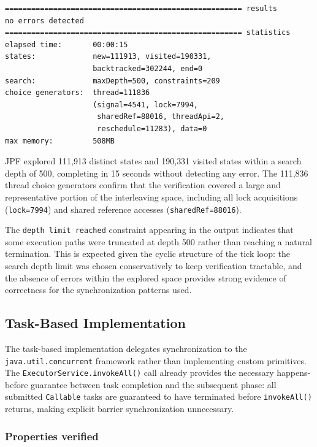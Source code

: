\documentclass[12pt,a4paper]{article}
\begin{document}
\begin{verbatim}
====================================================== results
no errors detected
====================================================== statistics
elapsed time:       00:00:15
states:             new=111913, visited=190331,
                    backtracked=302244, end=0
search:             maxDepth=500, constraints=209
choice generators:  thread=111836
                    (signal=4541, lock=7994,
                     sharedRef=88016, threadApi=2,
                     reschedule=11283), data=0
max memory:         508MB
\end{verbatim}

JPF explored 111{,}913 distinct states and 190{,}331 visited states
within a search depth of 500, completing in 15 seconds without detecting
any error. The 111{,}836 thread choice generators confirm that the
verification covered a large and representative portion of the
interleaving space, including all lock acquisitions (\texttt{lock=7994})
and shared reference accesses (\texttt{sharedRef=88016}).

The \texttt{depth limit reached} constraint appearing in the output
indicates that some execution paths were truncated at depth 500 rather
than reaching a natural termination. This is expected given the cyclic
structure of the tick loop: the search depth limit was chosen
conservatively to keep verification tractable, and the absence of errors
within the explored space provides strong evidence of correctness for the
synchronization patterns used.

\subsection{Task-Based Implementation}

The task-based implementation delegates synchronization to the
\texttt{java.util.concurrent} framework rather than implementing custom
primitives. The \texttt{ExecutorService.invokeAll()} call already provides
the necessary happens-before guarantee between task completion and the
subsequent phase: all submitted \texttt{Callable} tasks are guaranteed
to have terminated before \texttt{invokeAll()} returns, making explicit
barrier synchronization unnecessary.
 
\subsubsection*{Properties verified}
 
\end{document}
